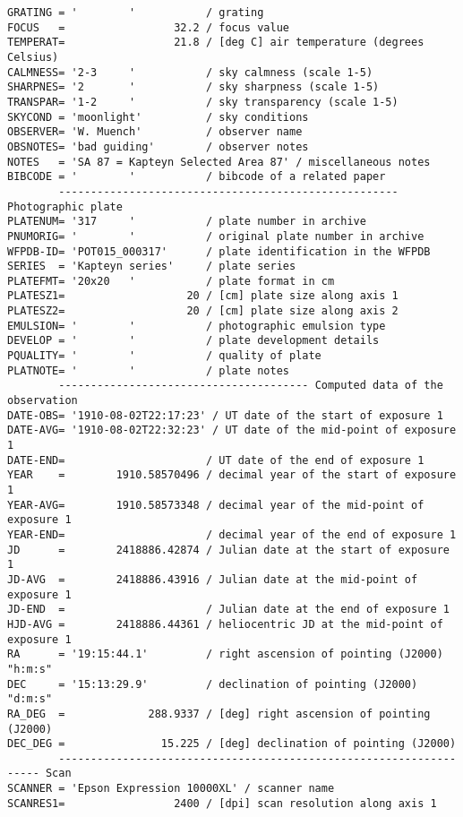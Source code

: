 \documentclass[11pt]{ivoa}
\begin{document}
\begin{lstlisting}
GRATING = '        '           / grating
FOCUS   =                 32.2 / focus value
TEMPERAT=                 21.8 / [deg C] air temperature (degrees Celsius)
CALMNESS= '2-3     '           / sky calmness (scale 1-5)
SHARPNES= '2       '           / sky sharpness (scale 1-5)
TRANSPAR= '1-2     '           / sky transparency (scale 1-5)
SKYCOND = 'moonlight'          / sky conditions
OBSERVER= 'W. Muench'          / observer name
OBSNOTES= 'bad guiding'        / observer notes
NOTES   = 'SA 87 = Kapteyn Selected Area 87' / miscellaneous notes
BIBCODE = '        '           / bibcode of a related paper
        ----------------------------------------------------- Photographic plate
PLATENUM= '317     '           / plate number in archive
PNUMORIG= '        '           / original plate number in archive
WFPDB-ID= 'POT015_000317'      / plate identification in the WFPDB
SERIES  = 'Kapteyn series'     / plate series
PLATEFMT= '20x20   '           / plate format in cm
PLATESZ1=                   20 / [cm] plate size along axis 1
PLATESZ2=                   20 / [cm] plate size along axis 2
EMULSION= '        '           / photographic emulsion type
DEVELOP = '        '           / plate development details
PQUALITY= '        '           / quality of plate
PLATNOTE= '        '           / plate notes
        --------------------------------------- Computed data of the observation
DATE-OBS= '1910-08-02T22:17:23' / UT date of the start of exposure 1
DATE-AVG= '1910-08-02T22:32:23' / UT date of the mid-point of exposure 1
DATE-END=                      / UT date of the end of exposure 1
YEAR    =        1910.58570496 / decimal year of the start of exposure 1
YEAR-AVG=        1910.58573348 / decimal year of the mid-point of exposure 1
YEAR-END=                      / decimal year of the end of exposure 1
JD      =        2418886.42874 / Julian date at the start of exposure 1
JD-AVG  =        2418886.43916 / Julian date at the mid-point of exposure 1
JD-END  =                      / Julian date at the end of exposure 1
HJD-AVG =        2418886.44361 / heliocentric JD at the mid-point of exposure 1
RA      = '19:15:44.1'         / right ascension of pointing (J2000) "h:m:s"
DEC     = '15:13:29.9'         / declination of pointing (J2000) "d:m:s"
RA_DEG  =             288.9337 / [deg] right ascension of pointing (J2000)
DEC_DEG =               15.225 / [deg] declination of pointing (J2000)
        ------------------------------------------------------------------- Scan
SCANNER = 'Epson Expression 10000XL' / scanner name
SCANRES1=                 2400 / [dpi] scan resolution along axis 1

\end{lstlisting}
\end{document}
